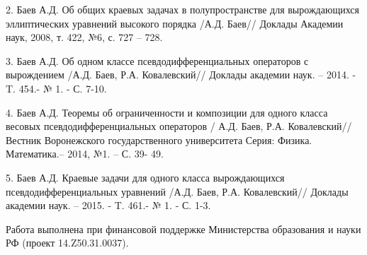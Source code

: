 2. Баев А.Д. Об общих краевых задачах в полупространстве для вырождающихся
эллиптических уравнений высокого порядка /А.Д. Баев// Доклады Академии наук,
2008, т. 422, №6, с. 727 -- 728.

3. Баев А.Д. Об одном классе псевдодифференциальных операторов с вырождением
/А.Д. Баев, Р.А. Ковалевский// Доклады академии наук. -- 2014. - T. 454.- №
1. - С. 7-10.

4. Баев А.Д. Теоремы об ограниченности и композиции для одного класса весовых
псевдодифференциальных операторов / А.Д. Баев, Р.А. Ковалевский// Вестник
Воронежского государственного университета Серия: Физика. Математика.--
2014, №1. -- С. 39- 49.

5. Баев А.Д. Краевые задачи для одного класса вырождающихся
псевдодифференциальных уравнений /А.Д. Баев, Р.А. Ковалевский// Доклады
академии наук. -- 2015. - T. 461.- № 1. - С. 1-3.

Работа выполнена при финансовой поддержке Министерства образования и науки
РФ (проект 14.Z50.31.0037).

